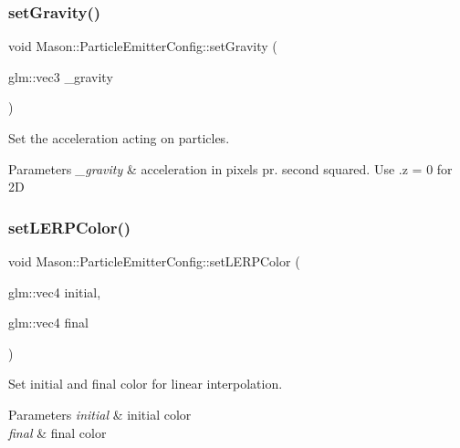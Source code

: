 \subsubsection{\texorpdfstring{set\+Gravity()}{setGravity()}}
{\footnotesize\ttfamily void Mason\+::\+Particle\+Emitter\+Config\+::set\+Gravity (\begin{DoxyParamCaption}\item[{glm\+::vec3}]{\+\_\+gravity }\end{DoxyParamCaption})\hspace{0.3cm}{\ttfamily [inline]}}



Set the acceleration acting on particles. 


\begin{DoxyParams}{Parameters}
{\em \+\_\+gravity} & acceleration in pixels pr. second squared. Use .z = 0 for 2D \\
\hline
\end{DoxyParams}
\hypertarget{struct_mason_1_1_particle_emitter_config_a09620b4edcadd022cd8a447da17867a0}{}\label{struct_mason_1_1_particle_emitter_config_a09620b4edcadd022cd8a447da17867a0} 
\subsubsection{\texorpdfstring{set\+L\+E\+R\+P\+Color()}{setLERPColor()}}
{\footnotesize\ttfamily void Mason\+::\+Particle\+Emitter\+Config\+::set\+L\+E\+R\+P\+Color (\begin{DoxyParamCaption}\item[{glm\+::vec4}]{initial,  }\item[{glm\+::vec4}]{final }\end{DoxyParamCaption})\hspace{0.3cm}{\ttfamily [inline]}}



Set initial and final color for linear interpolation. 


\begin{DoxyParams}{Parameters}
{\em initial} & initial color \\
\hline
{\em final} & final color \\
\hline
\end{DoxyParams}
\hypertarget{struct_mason_1_1_particle_emitter_config_ad96c857c3ceac520462a10981e471c4b}{}\label{struct_mason_1_1_particle_emitter_config_ad96c857c3ceac520462a10981e471c4b} 
